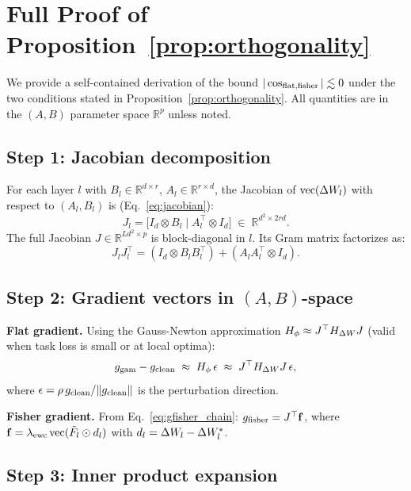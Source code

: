 \section{Full Proof of Proposition~\ref{prop:orthogonality}}
\label{sec:proof_orthogonality}

We provide a self-contained derivation of the bound $|\cos_{\mathrm{flat,fisher}}| \lesssim 0$
under the two conditions stated in Proposition~\ref{prop:orthogonality}.
All quantities are in the $(A,B)$ parameter space $\mathbb{R}^p$ unless noted.

\subsection*{Step 1: Jacobian decomposition}

For each layer $l$ with $B_l\in\mathbb{R}^{d\times r}$, $A_l\in\mathbb{R}^{r\times d}$,
the Jacobian of $\mathrm{vec}(\Delta W_l)$ with respect to $(A_l, B_l)$ is (Eq.~\eqref{eq:jacobian}):
\begin{equation}
  J_l = \bigl[I_d\otimes B_l \;\Big|\; A_l^\top\otimes I_d\bigr]
  \;\in\; \mathbb{R}^{d^2\times 2rd}.
\end{equation}
The full Jacobian $J\in\mathbb{R}^{Ld^2\times p}$ is block-diagonal in $l$.
Its Gram matrix factorizes as:
\begin{equation}
  J_l J_l^\top = (I_d\otimes B_lB_l^\top) + (A_lA_l^\top\otimes I_d).
  \label{eq:gram}
\end{equation}

\subsection*{Step 2: Gradient vectors in $(A,B)$-space}

\textbf{Flat gradient.}
Using the Gauss-Newton approximation $H_\phi \approx J^\top H_{\Delta W} J$
(valid when task loss is small or at local optima):
\begin{equation}
  g_{\mathrm{gam}} - g_{\mathrm{clean}} \;\approx\; H_\phi\,\epsilon \;\approx\; J^\top H_{\Delta W} J\,\epsilon,
  \label{eq:gflat_approx}
\end{equation}
where $\epsilon = \rho\,g_{\mathrm{clean}}/\|g_{\mathrm{clean}}\|$ is the perturbation direction.

\textbf{Fisher gradient.}
From Eq.~\eqref{eq:gfisher_chain}:
$g_{\mathrm{fisher}} = J^\top \mathbf{f}$,
where $\mathbf{f} = \lambda_{\mathrm{ewc}}\,\mathrm{vec}(\tilde{F}_l\odot d_l)$ with $d_l = \Delta W_l - \Delta W_l^*$.

\subsection*{Step 3: Inner product expansion}

